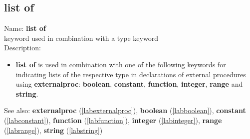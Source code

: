 \subsection{list of}
\label{lablistof}
\noindent Name: \textbf{list of}\\
\phantom{aaa}keyword used in combination with a type keyword\\[0.2cm]
\noindent Description: \begin{itemize}

\item \textbf{list of} is used in combination with one of the following keywords for
   indicating lists of the respective type in declarations of external
   procedures using \textbf{externalproc}: \textbf{boolean}, \textbf{constant}, \textbf{function},
   \textbf{integer}, \textbf{range} and \textbf{string}.
\end{itemize}
See also: \textbf{externalproc} (\ref{labexternalproc}), \textbf{boolean} (\ref{labboolean}), \textbf{constant} (\ref{labconstant}), \textbf{function} (\ref{labfunction}), \textbf{integer} (\ref{labinteger}), \textbf{range} (\ref{labrange}), \textbf{string} (\ref{labstring})
